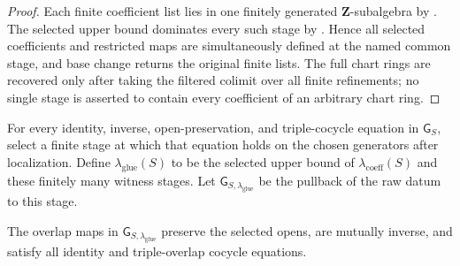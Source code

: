 \begin{proof}
  Each finite coefficient list lies in one finitely generated
  $\mathbf Z$-subalgebra by
  .  The selected upper bound
  dominates every such stage by
  .  Hence all selected
  coefficients and restricted maps are simultaneously defined at the named
  common stage, and base change returns the original finite lists.  The full
  chart rings are recovered only after taking the filtered colimit over all
  finite refinements; no single stage is asserted to contain every coefficient
  of an arbitrary chart ring.
\end{proof}

\begin{definition}
  \label{def:nagata-affine-gluing-valid-stage}

  For every identity, inverse, open-preservation, and triple-cocycle equation
  in $\mathsf G_S$, select a finite stage at which that equation holds on the
  chosen generators after localization.  Define
  $\lambda_{\mathrm{glue}}(S)$ to be the selected upper bound of
  $\lambda_{\mathrm{coeff}}(S)$ and these finitely many witness stages.  Let
  $\mathsf G_{S,\lambda_{\mathrm{glue}}}$ be the pullback of the raw datum to
  this stage.
\end{definition}

\begin{lemma}
  \label{lemma:nagata-affine-gluing-identities-eventually}

  The overlap maps in $\mathsf G_{S,\lambda_{\mathrm{glue}}}$ preserve the
  selected opens, are mutually inverse, and satisfy all identity and
  triple-overlap cocycle equations.
\end{lemma}

